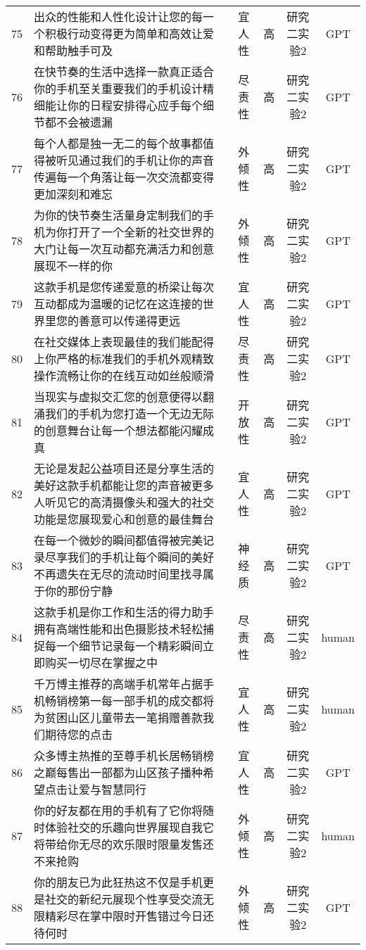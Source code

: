 {\begin{longtable}{c p{8cm} c c c c}
        75 & 出众的性能和人性化设计让您的每一个积极行动变得更为简单和高效让爱和帮助触手可及 & 宜人性 & 高 & 研究二实验2 & GPT \\
        76 & 在快节奏的生活中选择一款真正适合你的手机至关重要我们的手机设计精细能让你的日程安排得心应手每个细节都不会被遗漏 & 尽责性 & 高 & 研究二实验2 & GPT \\
        77 & 每个人都是独一无二的每个故事都值得被听见通过我们的手机让你的声音传遍每一个角落让每一次交流都变得更加深刻和难忘 & 外倾性 & 高 & 研究二实验2 & GPT \\
        78 & 为你的快节奏生活量身定制我们的手机为你打开了一个全新的社交世界的大门让每一次互动都充满活力和创意展现不一样的你 & 外倾性 & 高 & 研究二实验2 & GPT \\
        79 & 这款手机是您传递爱意的桥梁让每次互动都成为温暖的记忆在这连接的世界里您的善意可以传递得更远 & 宜人性 & 高 & 研究二实验2 & GPT \\
        80 & 在社交媒体上表现最佳的我们能配得上你严格的标准我们的手机外观精致操作流畅让你的在线互动如丝般顺滑 & 尽责性 & 高 & 研究二实验2 & GPT \\
        81 & 当现实与虚拟交汇您的创意便得以翻涌我们的手机为您打造一个无边无际的创意舞台让每一个想法都能闪耀成真 & 开放性 & 高 & 研究二实验2 & GPT \\
        82 & 无论是发起公益项目还是分享生活的美好这款手机都能让您的声音被更多人听见它的高清摄像头和强大的社交功能是您展现爱心和创意的最佳舞台 & 宜人性 & 高 & 研究二实验2 & GPT \\
        83 & 在每一个微妙的瞬间都值得被完美记录尽享我们的手机让每个瞬间的美好不再遗失在无尽的流动时间里找寻属于你的那份宁静 & 神经质 & 高 & 研究二实验2 & GPT \\
        84 & 这款手机是你工作和生活的得力助手拥有高端性能和出色摄影技术轻松捕捉每一个细节记录每一个精彩瞬间立即购买一切尽在掌握之中 & 尽责性 & 高 & 研究二实验2 & human \\
        85 & 千万博主推荐的高端手机常年占据手机畅销榜第一每一部手机的成交都将为贫困山区儿童带去一笔捐赠善款我们期待您的点击 & 宜人性 & 高 & 研究二实验2 & human \\
        86 & 众多博主热推的至尊手机长居畅销榜之巅每售出一部都为山区孩子播种希望点击让爱与智慧同行 & 宜人性 & 高 & 研究二实验2 & GPT \\
        87 & 你的好友都在用的手机有了它你将随时体验社交的乐趣向世界展现自我它将带给你无尽的欢乐限时限量发售还不来抢购 & 外倾性 & 高 & 研究二实验2 & human \\
        88 & 你的朋友已为此狂热这不仅是手机更是社交的新纪元展现个性享受交流无限精彩尽在掌中限时开售错过今日还待何时 & 外倾性 & 高 & 研究二实验2 & GPT \\

\end{longtable}}
